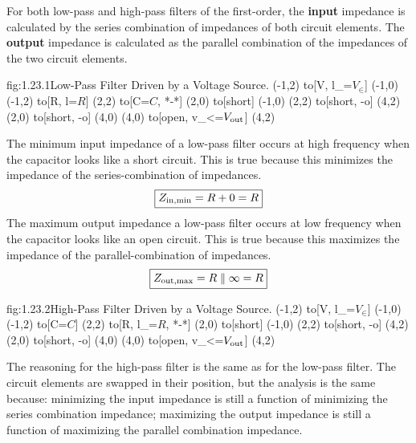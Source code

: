 For both low-pass and high-pass filters of the first-order, the \textbf{input} impedance is calculated by the series combination of impedances of both circuit elements.  The \textbf{output} impedance is calculated as the parallel combination of the impedances of the two circuit elements.
\begin{circuit}{fig:1.23.1}{Low-Pass Filter Driven by a Voltage Source.}
    (-1,2) to[V, l_=$V_\in$] (-1,0)
    (-1,2) to[R, l=$R$] (2,2)
    to[C=$C$, *-*] (2,0)
    to[short] (-1,0)
    (2,2)  to[short, -o] (4,2)
    (2,0) to[short, -o] (4,0)
    (4,0) to[open, v_<=$V_{\text{out}}$] (4,2)
\end{circuit}
The minimum input impedance of a low-pass filter occurs at high frequency when the capacitor looks like a short circuit.  This is true because this minimizes the impedance of the series-combination of impedances.
\[\boxed{Z_{\text{in},\min} = R + 0 = R}\]
The maximum output impedance a low-pass filter occurs at low frequency when the capacitor looks like an open circuit.  This is true because this maximizes the impedance of the parallel-combination of impedances.
\[\boxed{Z_{\text{out},\max} = R \parallel \infty = R}\]
\begin{circuit}{fig:1.23.2}{High-Pass Filter Driven by a Voltage Source.}
    (-1,2) to[V, l_=$V_\in$] (-1,0)
    (-1,2) to[C=$C$] (2,2)
    to[R, l_=$R$, *-*] (2,0)
    to[short] (-1,0)
    (2,2)  to[short, -o] (4,2)
    (2,0) to[short, -o] (4,0)
    (4,0) to[open, v_<=$V_{\text{out}}$] (4,2)
\end{circuit}
The reasoning for the high-pass filter is the same as for the low-pass filter.  The circuit elements are swapped in their position, but the analysis is the same because: minimizing the input impedance is still a function of minimizing the series combination impedance; maximizing the output impedance is still a function of maximizing the parallel combination impedance.

